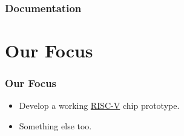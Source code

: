 \documentclass{weeklyslides}
\begin{document}
\subsubsection{Documentation}\label{subsubsec:Doc}
\begin{frame}
  \frametitle{}
\end{frame}


\section{Our Focus}\label{sec:Our_Focus}
\begin{frame}
  \frametitle{Our Focus}
  \begin{itemize}
  \item Develop a working \href{https://riscv.org/}{RISC-V} chip prototype.
  \item Something else too.
  \end{itemize}

\end{frame}
\end{document}
